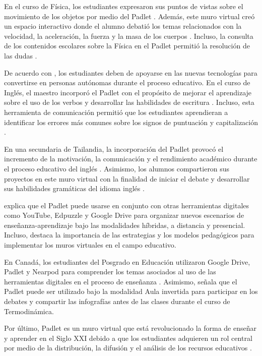 \documentclass[spanish]{textolivre}
\begin{document}
En el curso de Física, los estudiantes expresaron sus puntos de vistas sobre el movimiento de los objetos por medio del Padlet \cite{siantuba2023}. Además, este muro virtual creó un espacio interactivo donde el alumno debatió los temas relacionados con la velocidad, la aceleración, la fuerza y la masa de los cuerpos \cite{siantuba2023}. Incluso, la consulta de los contenidos escolares sobre la Física en el Padlet permitió la resolución de las dudas \cite{siantuba2023}.

De acuerdo con \textcite{almwzaiji2022}, los estudiantes deben de apoyarse en las nuevas tecnologías para convertirse en personas autónomas durante el proceso educativo. En el curso de Inglés, el maestro incorporó el Padlet con el propósito de mejorar el aprendizaje sobre el uso de los verbos y desarrollar las habilidades de escritura \cite{almwzaiji2022}. Incluso, esta herramienta de comunicación permitió que los estudiantes aprendieran a identificar los errores más comunes sobre los signos de puntuación y capitalización \cite{abdullah2022}.

En una secundaria de Tailandia, la incorporación del Padlet provocó el incremento de la motivación, la comunicación y el rendimiento académico durante el proceso educativo del inglés \cite{lee2023}. Asimismo, los alumnos compartieron sus proyectos en este muro virtual con la finalidad de iniciar el debate y desarrollar sus habilidades gramáticas del idioma inglés \cite{lee2023}.

\textcite{kong2021} explica que el Padlet puede usarse en conjunto con otras herramientas digitales como YouTube, Edpuzzle y Google Drive para organizar nuevos escenarios de enseñanza-aprendizaje bajo las modalidades híbridas, a distancia y presencial. Incluso, \textcite{kong2021} destaca la importancia de las estrategias y los modelos pedagógicos para implementar los muros virtuales en el campo educativo.

En Canadá, los estudiantes del Posgrado en Educación utilizaron Google Drive, Padlet y Nearpod para comprender los temas asociados al uso de las herramientas digitales en el proceso de enseñanza \cite{zhu2021}. Asimismo, \textcite{olaniyi2020} señala que el Padlet puede ser utilizado bajo la modalidad Aula invertida para participar en los debates y compartir las infografías antes de las clases durante el curso de Termodinámica. 

Por último, Padlet es un muro virtual que está revolucionado la forma de enseñar y aprender en el Siglo XXI debido a que los estudiantes adquieren un rol central por medio de la distribución, la difusión y el análisis de los recursos educativos \cite{almwzaiji2022,lomos2023,olaniyi2020}.
\end{document}
